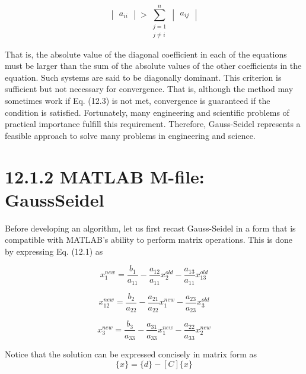 \documentclass[../main.tex]{subfiles}
\begin{document}
\begin{equation}
\begin{vmatrix}
a_{ii}
\end{vmatrix}
> \sum_{\begin{matrix}
j=1\\
j\neq i
\end{matrix}}^{n} \begin{vmatrix}
a_{ij}
\end{vmatrix} \tag{12.3}
\end{equation}

That is, the absolute value of the diagonal coefficient in each of the equations must be
larger than the sum of the absolute values of the other coefficients in the equation. Such
systems are said to be diagonally dominant. This criterion is sufficient but not necessary
for convergence. That is, although the method may sometimes work if Eq. (12.3) is not
met, convergence is guaranteed if the condition is satisfied. Fortunately, many engineering and scientific problems of practical importance fulfill this requirement. Therefore,
Gauss-Seidel represents a feasible approach to solve many problems in engineering and
science.

\section*{12.1.2 MATLAB M-file: GaussSeidel}

Before developing an algorithm, let us first recast Gauss-Seidel in a form that is compatible with MATLAB's ability to perform matrix operations. This is done by expressing
Eq. (12.1) as

\begin{equation}
x_{1}^{new}=\frac{b_{1}}{a_{11}}
-\frac{a_{12}}{a_{11}}x_{2}^{old}-\frac{a_{13}}{a_{11}}x_{13}^{old}
\end{equation}

\begin{equation}
x_{12}^{new}=\frac{b_{2}}{a_{22}}-\frac{a_{21}}{a_{22}}x_{1}^{new}
-\frac{a_{23}}{a_{23}}x_{3}^{old}
\end{equation}

\begin{equation}
x_{3}^{new}= \frac{b_{3}}{a_{33}}-\frac{a_{31}}{a_{33}}x_{1}^{new}-\frac{a_{22}}{a_{33}}x_{2}^{new}
\end{equation}

Notice that the solution can be expressed concisely in matrix form as
\begin{equation}
\{x\}=\{d\}-[C]\{x\}
\tag{12.4}
\end{equation}
\end{document}
